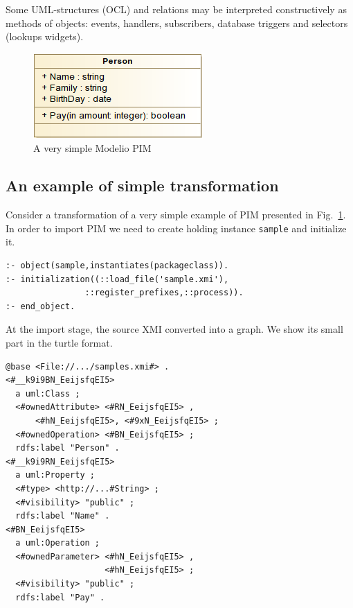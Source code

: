 \documentclass[conference,a4paper]{IEEEtran}
\begin{document}

Some UML-structures (OCL) and relations may be interpreted constructively as methods of objects: events, handlers, subscribers, database triggers and selectors (lookups widgets).

\begin{figure}[t]
  \centering
  \includegraphics[width=0.6\linewidth]{pics/samples-Class-diagram.png}
  \caption{A very simple Modelio PIM}
  \label{fig:pim}
\end{figure}

\subsection{An example of simple transformation}
\label{sec:simpletr}

Consider a transformation of a very simple example of PIM presented in Fig.~\ref{fig:pim}.  In order to import PIM we need to create holding instance \texttt{sample} and initialize it.
\begin{verbatim}
:- object(sample,instantiates(packageclass)).
:- initialization((::load_file('sample.xmi'),
                ::register_prefixes,::process)).
:- end_object.
\end{verbatim}
At the import stage, the source XMI converted into a graph.  We show its small part in the turtle format.
\begin{verbatim}
@base <File://.../samples.xmi#> .
<#__k9i9BN_EeijsfqEI5>
  a uml:Class ;
  <#ownedAttribute> <#RN_EeijsfqEI5> ,
      <#hN_EeijsfqEI5>, <#9xN_EeijsfqEI5> ;
  <#ownedOperation> <#BN_EeijsfqEI5> ;
  rdfs:label "Person" .
<#__k9i9RN_EeijsfqEI5>
  a uml:Property ;
  <#type> <http://...#String> ;
  <#visibility> "public" ;
  rdfs:label "Name" .
<#BN_EeijsfqEI5>
  a uml:Operation ;
  <#ownedParameter> <#hN_EeijsfqEI5> ,
                    <#hN_EeijsfqEI5> ;
  <#visibility> "public" ;
  rdfs:label "Pay" .
\end{verbatim}
\end{document}
